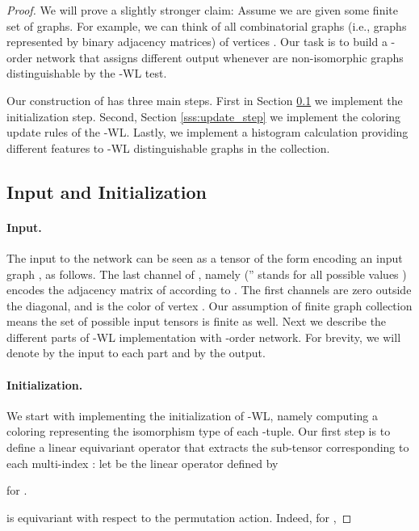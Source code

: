\documentclass{article}
\newcommand{\ie}{{i.e.}}
\begin{document}
\begin{proof}

We will prove a slightly stronger claim: Assume we are given some finite set of graphs. For example, we can think of all combinatorial graphs (\ie, graphs represented by binary adjacency matrices) of  vertices . Our task is to build a -order network  that assigns different output  whenever  are non-isomorphic graphs distinguishable by the -WL test. 

Our construction of  has three main steps. First in Section \ref{sss:input_and_init} we implement the initialization step. Second, Section \ref{sss:update_step} we implement the coloring update rules of the -WL. Lastly, we implement a histogram calculation providing different features to -WL distinguishable graphs in the collection. 



\subsection{Input and Initialization}\label{sss:input_and_init}

\paragraph{Input.}
The input to the network can be seen as a tensor of the form   encoding an input graph , as follows. 
The last channel of , namely  ('' stands for all possible values ) encodes the adjacency matrix of  according to . The first  channels  are zero outside the diagonal, and  is the color of vertex . 
Our assumption of finite graph collection means the set  of possible input tensors  is finite as well. 
Next we describe the different parts of -WL implementation with -order network. For brevity, we will denote by  the input to each part and by  the output. 

\paragraph{Initialization.}
We start with implementing the initialization of -WL, namely computing a coloring representing the isomorphism type of each -tuple. 
Our first step is to define a linear equivariant operator that extracts the sub-tensor corresponding to each multi-index : let  be the linear operator defined by 
 
for . 

 is equivariant with respect to the permutation action. Indeed, for , 
 

\end{proof}
\end{document}
